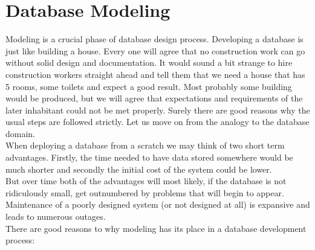 \chapter{Database Modeling}
\label{chap:database_modeling}

Modeling is a crucial phase of database design process.
Developing a database is just like building a house. 
Every one will agree that no construction work can go without solid design and documentation. 
It would sound a bit strange to hire construction workers straight ahead and tell them that we need a house that has 5 rooms, some toilets and expect a good result. Most probably some building would be produced, but we will agree that expectations and requirements of the later inhabitant could not be met properly.
Surely there are good reasons why the usual steps are followed strictly.
Let us move on from the analogy to the database domain. \\
When deploying a database from a scratch we may think of two short term advantages. Firstly, the time needed to have data stored somewhere would be much shorter and secondly the initial cost of the system could be lower. \\
But over time both of the advantages will most likely, if the database is not ridiculously small, get outnumbered by problems that will begin to appear. Maintenance of a poorly designed system (or not designed at all) is expansive and leads to numerous outages.\\

There are good reasons to why modeling has its place in a database development process:

